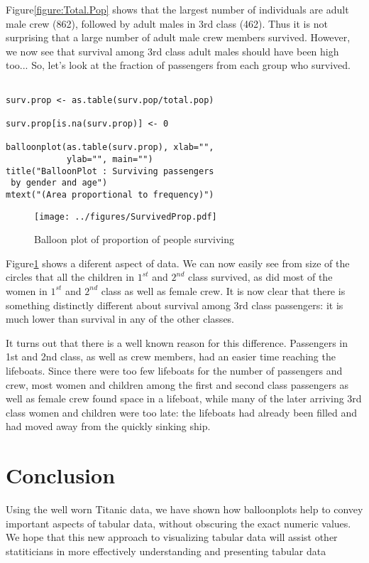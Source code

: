 \documentclass[a4paper]{report}
\begin{document}
\begin{article}
Figure\ref{figure:Total.Pop} shows that the largest number of
individuals are adult male crew (862), followed by adult males in
3rd class (462).  Thus it is not surprising that a large number of
adult male crew members survived.  However, we now see that survival
among 3rd class adult males should have been high too...  So, let's
look at the fraction of passengers from each group who survived.

{\small
\begin{verbatim}

surv.prop <- as.table(surv.pop/total.pop)

surv.prop[is.na(surv.prop)] <- 0

balloonplot(as.table(surv.prop), xlab="",
            ylab="", main="")
title("BalloonPlot : Surviving passengers
 by gender and age")
mtext("(Area proportional to frequency)")
\end{verbatim}
}


\begin{figure}
\texttt{[image: ../figures/SurvivedProp.pdf]}
\caption{\label{figure:Surv.Prop}
Balloon plot of proportion of people surviving}
\end{figure}

Figure\ref{figure:Surv.Prop} shows a diferent aspect of data. We can
now easily see from size of the circles that all the children in
$1^{st}$ and $2^{nd}$ class survived, as did most of the women in
$1^{st}$ and $2^{nd}$ class as well as female crew.  It is now clear
that there is something distinctly different about survival among
3rd class passengers: it is much lower than survival in any of the
other classes.

It turns out that there is a well known reason for this difference.
Passengers in 1st and 2nd class, as well as crew members, had an
easier time reaching the lifeboats.  Since there were too few
lifeboats for the number of passengers and crew, most women and
children among the first and second class passengers as well as
female crew found space in a lifeboat, while many of the later
arriving 3rd class women and children were too late: the lifeboats
had already been filled and had moved away from the quickly sinking
ship.

\section*{Conclusion}

Using the well worn Titanic data, we have shown how balloonplots
help to convey important aspects of tabular data, without obscuring
the exact numeric values. We hope that this new approach to
visualizing tabular data will assist other statiticians in more
effectively understanding and presenting tabular data


\end{article}
\end{document}
